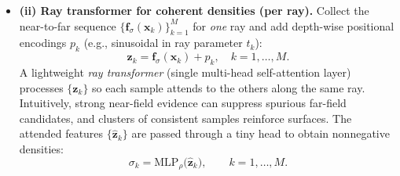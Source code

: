 \begin{enrichment}
\begin{enrichment}
\begin{itemize}
\begin{itemize}
\begin{itemize}
\[                 \]
                 yielding a multi-view–aware feature $\mathbf{f}'_i$ and a reliability score $s_i$. Normalize scores into \emph{visibility-aware} weights
                 \[
                 w_i=\frac{\exp(s_i)}{\sum_{j=1}^{N}\exp(s_j)},
                 \]
                 then form weighted first- and second-order statistics and map them to a compact density feature:
                 \[
                 \boldsymbol{\mu}_w=\sum_{i=1}^{N} w_i\,\mathbf{f}'_i,\qquad
                 \mathbf{v}_w=\sum_{i=1}^{N} w_i\,(\mathbf{f}'_i-\boldsymbol{\mu}_w)^{\odot 2},\qquad
                 \mathbf{f}_\sigma(\mathbf{x}_k)=\mathrm{MLP}_\psi\!\big([\boldsymbol{\mu}_w,\ \mathbf{v}_w]\big)\in\mathbb{R}^{d_\sigma}.
                 \]
                 This pooling handles a variable number of views, downweights inconsistent/occluded views, and summarizes multi-view agreement at $\mathbf{x}_k$ into a fixed-length descriptor predictive of occupancy~\cite{wang2021_ibrnet}.
                 \item \textbf{(ii) Ray transformer for coherent densities (per ray).} Collect the near-to-far sequence $\{\mathbf{f}_\sigma(\mathbf{x}_k)\}_{k=1}^{M}$ for \emph{one} ray and add depth-wise positional encodings $p_k$ (e.g., sinusoidal in ray parameter $t_k$):
                 \[
                 \mathbf{z}_k=\mathbf{f}_\sigma(\mathbf{x}_k)+p_k,\quad k=1,\dots,M.
                 \]
                 A lightweight \emph{ray transformer} (single multi-head self-attention layer) processes $\{\mathbf{z}_k\}$ so each sample attends to the others along the same ray. Intuitively, strong near-field evidence can suppress spurious far-field candidates, and clusters of consistent samples reinforce surfaces. The attended features $\{\hat{\mathbf{z}}_k\}$ are passed through a tiny head to obtain nonnegative densities:
                 \[
                 \sigma_k=\mathrm{MLP}_\rho\!\big(\hat{\mathbf{z}}_k\big),\qquad k=1,\dots,M.
                 \]
             \end{itemize}
         \end{itemize}
         

\end{itemize}
\end{enrichment}
\end{enrichment}

